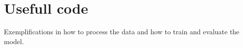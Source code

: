 \chapter{Usefull code}
\hypertarget{md_src_2msecnn__raulkviana_2useful__scripts_2_r_e_a_d_m_e}{}\label{md_src_2msecnn__raulkviana_2useful__scripts_2_r_e_a_d_m_e}
\label{md_src_2msecnn__raulkviana_2useful__scripts_2_r_e_a_d_m_e_autotoc_md37}%
%
Exemplifications in how to process the data and how to train and evaluate the model. 